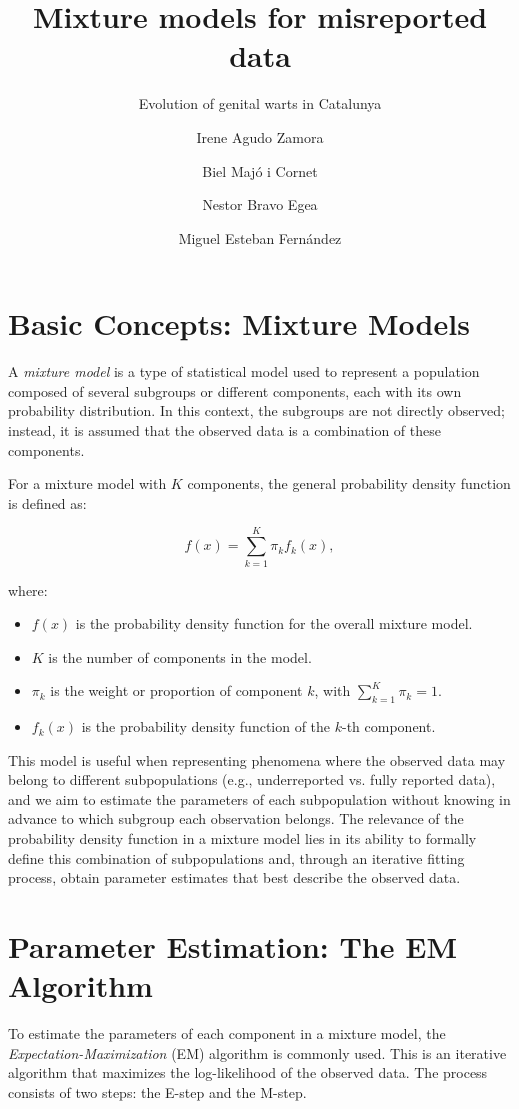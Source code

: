 \documentclass[acmsmall, nonacm]{acmart}
\title{Mixture models for misreported data}
\subtitle{Evolution of genital warts in Catalunya}
\author{Irene Agudo Zamora}
\author{Biel Majó i Cornet}
\author{Nestor Bravo Egea}
\author{Miguel Esteban Fernández}
\begin{document}
\maketitle

\section{Basic Concepts: Mixture Models}

A \textit{mixture model} is a type of statistical model used to represent a population composed of several subgroups or different components, each with its own probability distribution. In this context, the subgroups are not directly observed; instead, it is assumed that the observed data is a combination of these components.

For a mixture model with \( K \) components, the general probability density function is defined as:

\[
f(x) = \sum_{k=1}^{K} \pi_k f_k(x),
\]

where:
\begin{itemize}
    \item \( f(x) \) is the probability density function for the overall mixture model.
    \item \( K \) is the number of components in the model.
    \item \( \pi_k \) is the weight or proportion of component \( k \), with \( \sum_{k=1}^{K} \pi_k = 1 \).
    \item \( f_k(x) \) is the probability density function of the \( k \)-th component.
\end{itemize}

This model is useful when representing phenomena where the observed data may belong to different subpopulations (e.g., underreported vs. fully reported data), and we aim to estimate the parameters of each subpopulation without knowing in advance to which subgroup each observation belongs. The relevance of the probability density function in a mixture model lies in its ability to formally define this combination of subpopulations and, through an iterative fitting process, obtain parameter estimates that best describe the observed data.

\section{Parameter Estimation: The EM Algorithm}

To estimate the parameters of each component in a mixture model, the \textit{Expectation-Maximization} (EM) algorithm is commonly used. This is an iterative algorithm that maximizes the log-likelihood of the observed data. The process consists of two steps: the E-step and the M-step.
\end{document}
